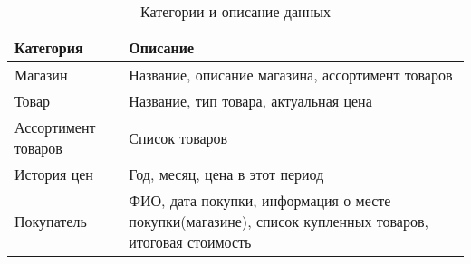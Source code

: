 \documentclass[a4paper,14pt]{extreport}
\begin{document}
\captionsetup[table]{skip=-12pt}
\captionsetup{singlelinecheck = false, justification=raggedright}
\begin{table}[H]
	\caption{Категории и описание данных}
	\begin{center}
		\begin{tabular}{| l | p{11 cm} |} 
			\hline
			
			\textbf{Категория} & \textbf{Описание} \\  
			
			\hline
			
			Магазин & Название, описание магазина, ассортимент товаров \\
			
			\hline
			
			Товар & Название, тип товара, актуальная цена \\
			
			\hline
			
			Ассортимент товаров & Список товаров \\
			
			\hline
			
			История цен & Год, месяц, цена в этот период \\
			
			\hline
			
			Покупатель & ФИО, дата покупки, информация о месте покупки(магазине), список купленных товаров, итоговая стоимость \\
			\hline
		\end{tabular}
	\end{center}
\end{table}
\end{document}
